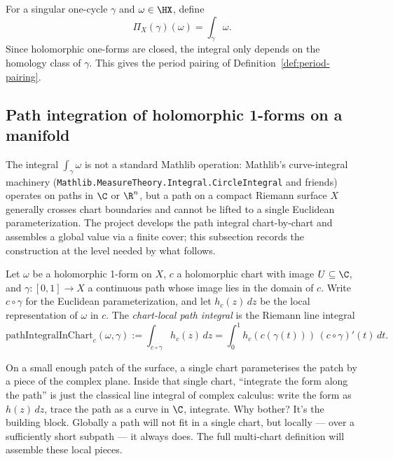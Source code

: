 For a singular one-cycle \(\gamma\) and \(\omega\in\HX\), define
\[
  \Pi_X(\gamma)(\omega)=\int_{\gamma}\omega.
\]
Since holomorphic one-forms are closed, the integral only depends on the
homology class of \(\gamma\). This gives the period pairing of
Definition~\ref{def:period-pairing}.

\subsection{Path integration of holomorphic 1-forms on a manifold}

The integral \(\int_\gamma\omega\) is not a standard Mathlib operation:
Mathlib's curve-integral machinery
(\texttt{Mathlib.MeasureTheory.Integral.CircleIntegral} and friends)
operates on paths in \(\C\) or \(\R^n\), but a path on a compact
Riemann surface \(X\) generally crosses chart boundaries and cannot
be lifted to a single Euclidean parameterization. The project
develops the path integral chart-by-chart and assembles a global
value via a finite cover; this subsection records the construction
at the level needed by what follows.

\begin{definition}
\label{def:path-integral-in-chart}
Let \(\omega\) be a holomorphic 1-form on \(X\), \(c\) a holomorphic
chart with image \(U\subseteq\C\), and \(\gamma:[0,1]\to X\) a
continuous path whose image lies in the domain of \(c\). Write
\(c\circ\gamma\) for the Euclidean parameterization, and let
\(h_c(z)\,dz\) be the local representation of \(\omega\) in \(c\).
The \emph{chart-local path integral} is the Riemann line integral
\[
  \mathrm{pathIntegralInChart}_c(\omega,\gamma)
    := \int_{c\circ\gamma} h_c(z)\,dz
    = \int_0^1 h_c(c(\gamma(t)))\,(c\circ\gamma)'(t)\,dt.
\]
\leanok
\end{definition}

\begin{layman}
On a small enough patch of the surface, a single chart parameterises
the patch by a piece of the complex plane. Inside that single
chart, ``integrate the form along the path'' is just the classical
line integral of complex calculus: write the form as \(h(z)\,dz\),
trace the path as a curve in \(\C\), integrate. Why bother? It's
the building block. Globally a path will not fit in a single chart,
but locally — over a sufficiently short subpath — it always does.
The full multi-chart definition will assemble these local pieces.
\end{layman}

